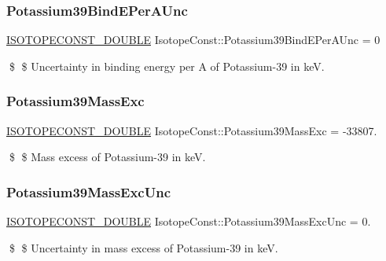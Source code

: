 \subsubsection{\texorpdfstring{Potassium39\+Bind\+E\+Per\+A\+Unc}{Potassium39BindEPerAUnc}}
{\footnotesize\ttfamily \mbox{\hyperlink{group___isotope_const-_macros_ga8f45a7272ce02c0b4c65c44636ed719a}{I\+S\+O\+T\+O\+P\+E\+C\+O\+N\+S\+T\+\_\+\+D\+O\+U\+B\+LE}} Isotope\+Const\+::\+Potassium39\+Bind\+E\+Per\+A\+Unc = 0}

\$ \$ Uncertainty in binding energy per A of Potassium-\/39 in keV. \mbox{\label{group___isotope_const-_potassium-_k39_gad1f510bcefdf615711ba62dce228f5d1}} 
\subsubsection{\texorpdfstring{Potassium39\+Mass\+Exc}{Potassium39MassExc}}
{\footnotesize\ttfamily \mbox{\hyperlink{group___isotope_const-_macros_ga8f45a7272ce02c0b4c65c44636ed719a}{I\+S\+O\+T\+O\+P\+E\+C\+O\+N\+S\+T\+\_\+\+D\+O\+U\+B\+LE}} Isotope\+Const\+::\+Potassium39\+Mass\+Exc = -\/33807.}

\$ \$ Mass excess of Potassium-\/39 in keV. \mbox{\label{group___isotope_const-_potassium-_k39_gae3548393997c5168d0f83cf5ae61f331}} 
\subsubsection{\texorpdfstring{Potassium39\+Mass\+Exc\+Unc}{Potassium39MassExcUnc}}
{\footnotesize\ttfamily \mbox{\hyperlink{group___isotope_const-_macros_ga8f45a7272ce02c0b4c65c44636ed719a}{I\+S\+O\+T\+O\+P\+E\+C\+O\+N\+S\+T\+\_\+\+D\+O\+U\+B\+LE}} Isotope\+Const\+::\+Potassium39\+Mass\+Exc\+Unc = 0.}

\$ \$ Uncertainty in mass excess of Potassium-\/39 in keV. \mbox{\label{group___isotope_const-_potassium-_k39_gac3b71d021a94147abd8fd13fee1fd744}} 
